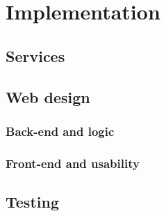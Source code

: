 \chapter{Implementation}\label{ch:implementation}


\section{Services}\label{sec:servicesImp}


\section{Web design}\label{sec:webdesign}
\subsection{Back-end and logic}\label{sec:backend}
\subsection{Front-end and usability}\label{sec:frontend}


\section{Testing}\label{sec:testing}
